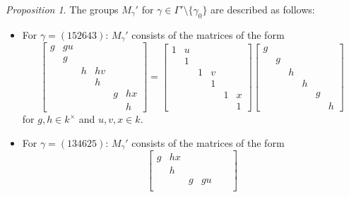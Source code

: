 \documentclass[12pt]{amsart}
\theoremstyle{Theorem}
\theoremstyle{Theorem}
\theoremstyle{Theorem}
\theoremstyle{Theorem}
\theoremstyle{Plain}
\theoremstyle{remark}
\theoremstyle{remark}
\theoremstyle{Definition}
\newtheorem{prpd}[dfn]{Proposition}
\begin{document}
\begin{prpd}
    The groups $M_\gamma'$ for $ \gamma \in \Gamma' \setminus \{ \gamma_0 \} $ are described as follows:
    \begin{itemize}
        \item[(a)] For $ \gamma = (152643) $: $M_\gamma'$ consists of the matrices of the form
        \[
            \begin{bmatrix}
                g & gu &   &    &   &   \\
                  & g  &   &    &   &   \\
                  &    & h & hv &   &   \\
                  &    &   & h  &   &   \\
                  &    &   &    & g & hx\\
                  &    &   &    &   & h
            \end{bmatrix}
            =
            \begin{bmatrix}
                1 & u &   &   &   &  \\
                  & 1 &   &   &   &  \\
                  &   & 1 & v &   &  \\
                  &   &   & 1 &   &  \\
                  &   &   &   & 1 & x\\
                  &   &   &   &   & 1
            \end{bmatrix}
            \begin{bmatrix}
                g &   &   &   &   &  \\
                  & g &   &   &   &  \\
                  &   & h &   &   &  \\ 
                  &   &   & h &   &  \\
                  &   &   &   & g &  \\
                  &   &   &   &   & h
            \end{bmatrix}
        \]
        for $ g, h \in k^\times $ and $ u, v, x \in k $.
        \item[(b)] For $ \gamma = (134625) $: $M_\gamma'$ consists of the matrices of the form
        \[
            \begin{bmatrix}
                g & hx &   &    &   &   \\
                  & h  &   &    &   &   \\
                  &    & g & gu &   &   \\

\end{bmatrix}\]
\end{itemize}
\end{prpd}
\end{document}
